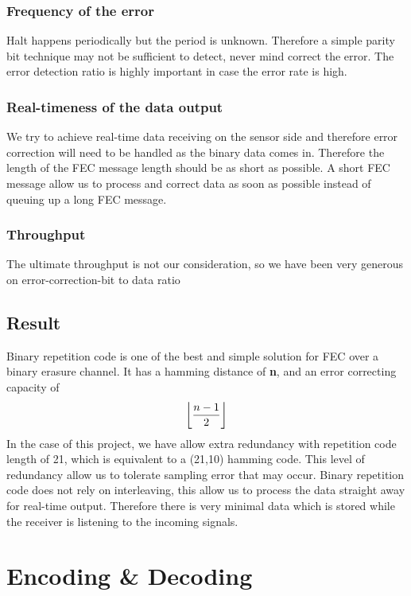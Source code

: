 \documentclass[letterpaper, 10 pt, conference]{ieeeconf}  %
\DeclarePairedDelimiter\floor{\lfloor}{\rfloor}
\begin{document}
\subsubsection*{\textbf{Frequency of the error}}
Halt happens periodically but the period is unknown. Therefore a simple parity bit technique may not be sufficient to detect, never mind correct the error. The error detection ratio is highly important in case the error rate is high.
\\
\subsubsection*{\textbf{Real-timeness of the data output}}
We try to achieve real-time data receiving on the sensor side and therefore error correction will need to be handled as the binary data comes in. Therefore the length of the FEC message length should be as short as possible. A short FEC message allow us to process and correct data as soon as possible instead of queuing up a long FEC message.
\\
\subsubsection*{\textbf{Throughput}}
The ultimate throughput is not our consideration, so we have been very generous on error-correction-bit to data ratio
\\


\subsection*{Result}
Binary repetition code\cite{Bossert1999} is one of the best and simple solution for FEC over a binary erasure channel. It has a hamming distance of \textbf{n}, and an error correcting capacity of
\begin{equation*}
    \floor*{\frac{n - 1}{2}}
\end{equation*}
In the case of this project, we have allow extra redundancy with repetition code length of 21, which is equivalent to a (21,10) hamming code. This level of redundancy allow us to tolerate sampling error that may occur. Binary repetition code does not rely on interleaving, this allow us to process the data straight away for real-time output. Therefore there is very minimal data which is stored while the receiver is listening to the incoming signals.



\section{Encoding \& Decoding}
\end{document}

